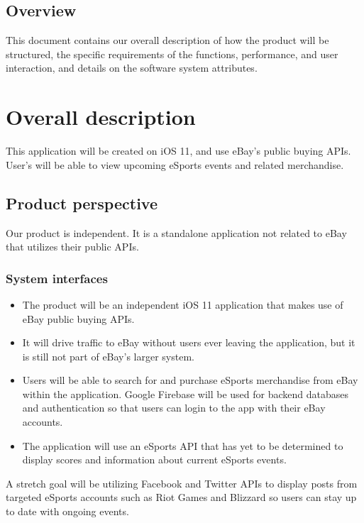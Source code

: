 \documentclass[onecolumn, draftclsnofoot,10pt, compsoc]{IEEEtran}
\begin{document}
\subsection{Overview}
This document contains our overall description of how the product will be structured,  the specific requirements of the functions, performance, and user interaction, and details on the software system attributes.
    
\section{Overall description}
This application will be created on iOS 11, and use eBay's public buying APIs. User's will be able to view upcoming eSports events and related merchandise.

\subsection{Product perspective}
Our product is independent. It is a standalone application not related to eBay that utilizes their public APIs.

\subsubsection{System interfaces}
\begin{itemize}
\item The product will be an independent iOS 11 application that makes use of eBay public buying APIs. 
\item It will drive traffic to eBay without users ever leaving the application, but it is still not part of eBay’s larger system. 
\item Users will be able to search for and purchase eSports merchandise from eBay within the application. 
Google Firebase will be used for backend databases and authentication so that users can login to the app with their eBay accounts. 
\item The application will use an eSports API that has yet to be determined to display scores and information about current eSports events.
\end{itemize}

A stretch goal will be utilizing Facebook and Twitter APIs to display posts from targeted eSports accounts such as Riot Games and Blizzard so users can stay up to date with ongoing events. 
\end{document}
